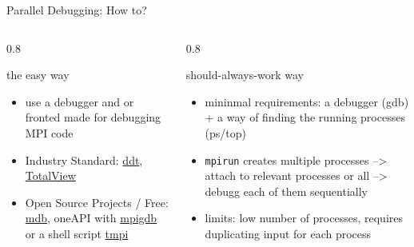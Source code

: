 \documentclass[aspectratio=1610]{beamer}
\newenvironment{centeredblock}[2][0.8\textwidth]
{ %
	\begin{center}
		\begin{varwidth}{#1} %
			\begin{block}{#2}
				\centering
			}
			{ %
			\end{block}
		\end{varwidth}
	\end{center}
}
\begin{document}
	\begin{frame}[fragile]{Parallel Debugging: How to?}
			\begin{columns}
				\hfill
				\begin{column}{0.5\textwidth}
					\begin{centeredblock}{the easy way}
						\begin{itemize}
							\item use a debugger and or fronted made for debugging MPI code
							\item Industry Standard: \href{https://www.linaroforge.com/}{ddt}\footnotemark, \href{https://totalview.io/}{TotalView}\footnotemark[1]
							\item Open Source Projects / Free: \href{https://github.com/TomMelt/mdb?tab=readme-ov-file}{mdb}, oneAPI with \href{https://www.intel.com/content/www/us/en/docs/distribution-for-gdb/tutorial-debugging-dpcpp-linux/2024-1/debugging-mpi-programs.html}{mpigdb} or a shell script \href{https://github.com/Azrael3000/tmpi}{tmpi}
						\end{itemize}
					\end{centeredblock}
				\end{column}
				\hfill
				\begin{column}{0.5\textwidth}
					\begin{centeredblock}{should-always-work way}
						\begin{itemize}
							\item mininmal requirements: a debugger (gdb) + a way of finding the running processes (ps/top)
							\item \texttt{mpirun} creates multiple processes --> attach to relevant processes or all --> debugg each of them sequentially
							\item limits: low number of processes, requires duplicating input for each process
						\end{itemize}
					\end{centeredblock}
				\end{column}
				\hfill
			\end{columns}
		
	\end{frame}
	
\end{document}
